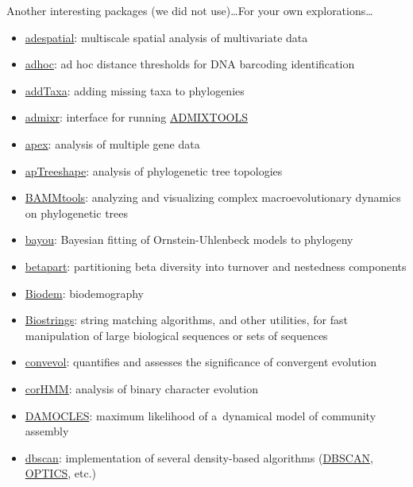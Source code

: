\documentclass[compress, ucs, xelatex, 11pt, xcolor=svgnames, aspectratio=169,
	hyperref={
		bookmarks=true,
		unicode=true,
		colorlinks=true,
		pdftitle={Molecular data in R},
		plainpages=false,
		pdfauthor={Vojtech Zeisek},
		pdfsubject={Course about phylogeny and evolution in R},
		pdfcreator={XeLaTeX},
		pdfkeywords={R, evolution, phylogeny, molecular data},
		linkcolor=Crimson, %
		anchorcolor=Magenta, %
		citecolor=Magenta, %
		filecolor=Magenta, %
		menucolor=Magenta, %
		urlcolor=DodgerBlue, %
		pdftex},
	url={hyphens, lowtilde} %
	]{beamer}
\begin{document}
\begin{frame}[allowframebreaks]{Another interesting packages (we did not use)\ldots}{For your own explorations\ldots}
	\begin{itemize}
		\item \href{https://CRAN.R-project.org/package=adespatial}{adespatial}: multiscale spatial analysis of multivariate data
		\item \href{https://CRAN.R-project.org/package=adhoc}{adhoc}: ad hoc distance thresholds for DNA barcoding identification
		\item \href{https://github.com/eliotmiller/addTaxa}{addTaxa}: adding missing taxa to phylogenies
		\item \href{https://CRAN.R-project.org/package=admixr}{admixr}: interface for running \href{https://www.genetics.org/content/192/3/1065}{ADMIXTOOLS}
		\item \href{https://CRAN.R-project.org/package=apex}{apex}: analysis of multiple gene data
		\item \href{https://CRAN.R-project.org/package=apTreeshape}{apTreeshape}: analysis of phylogenetic tree topologies
		\item \href{https://CRAN.R-project.org/package=BAMMtools}{BAMMtools}: analyzing and visualizing complex macroevolutionary dynamics on phylogenetic trees
		\item \href{https://CRAN.R-project.org/package=bayou}{bayou}: Bayesian fitting of Ornstein-Uhlenbeck models to phylogeny
		\item \href{https://CRAN.R-project.org/package=betapart}{betapart}: partitioning beta diversity into turnover and nestedness components
		\item \href{https://CRAN.R-project.org/package=Biodem}{Biodem}: biodemography
		\item \href{https://www.bioconductor.org/packages/release/bioc/html/Biostrings.html}{Biostrings}: string matching algorithms, and other utilities, for fast manipulation of large biological sequences or sets of sequences
		\item \href{https://CRAN.R-project.org/package=convevol}{convevol}: quantifies and assesses the significance of convergent evolution
		\item \href{https://CRAN.R-project.org/package=corHMM}{corHMM}: analysis of binary character evolution
		\item \href{https://CRAN.R-project.org/package=DAMOCLES}{DAMOCLES}: maximum likelihood of a~dynamical model of community assembly
		\item \href{https://CRAN.R-project.org/package=dbscan}{dbscan}: implementation of several density-based algorithms (\href{https://en.wikipedia.org/wiki/DBSCAN}{DBSCAN}, \href{https://en.wikipedia.org/wiki/OPTICS_algorithm}{OPTICS}, etc.)

\end{itemize}
\end{frame}
\end{document}
